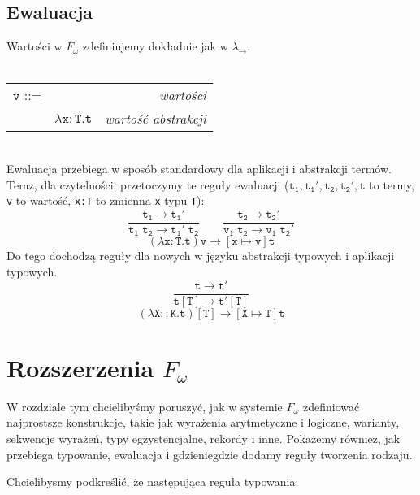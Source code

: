 \documentclass[11pt,leqno]{article}
\begin{document}
\subsection{Ewaluacja}

Wartości w $F_\omega$ zdefiniujemy dokładnie jak w $\lambda_{\rightarrow}$. \\ \\
\begin{tabular}{| l c r |}
  \hline
  $\mathtt{v}$ ::= &  & \textit{wartości}  \\
   & $\mathtt{\lambda x:T.t}$ & \textit{wartość abstrakcji} \\
  \hline
\end{tabular} \\

Ewaluacja przebiega w sposób standardowy dla aplikacji i abstrakcji termów. Teraz, dla czytelności, przetoczymy te reguły ewaluacji ($\mathtt{t_1,t_1',t_2,t_2',t}$ to termy, \texttt{v} to wartość, \texttt{x:T} to zmienna \texttt{x} typu \texttt{T}):
	\[\mathtt{
		\frac{t_1 \longrightarrow t_1'}{t_1\;t_2 \longrightarrow t_1'\;t_2}
                \qquad
                \frac{t_2 \longrightarrow t_2'}{v_1\;t_2 \longrightarrow v_1\;t_2'}}
	\]
 	\[\mathtt{
		(\lambda x:T.t)v \longrightarrow [x \mapsto v]t}
	\]
Do tego dochodzą reguły dla nowych w języku abstrakcji typowych i aplikacji typowych.
	\[\mathtt{
		\frac{t \longrightarrow t'}{t[T] \longrightarrow t'[T]}}
	\]
 	\[\mathtt{
		(\lambda X::K.t)[T] \longrightarrow [X \mapsto T]t}
	\]

\section{Rozszerzenia $F_\omega$}
\setcounter{equation}{0}

W rozdziale tym chcielibyśmy poruszyć, jak w systemie $F_\omega$ zdefiniować najprostsze
konstrukcje, takie jak wyrażenia arytmetyczne i logiczne, warianty, sekwencje wyrażeń, 
typy egzystencjalne, rekordy i inne. Pokażemy również, jak przebiega typowanie, ewaluacja i 
gdzieniegdzie dodamy reguły tworzenia rodzaju.

Chcielibysmy podkreślić, że następująca reguła typowania:
\end{document}
